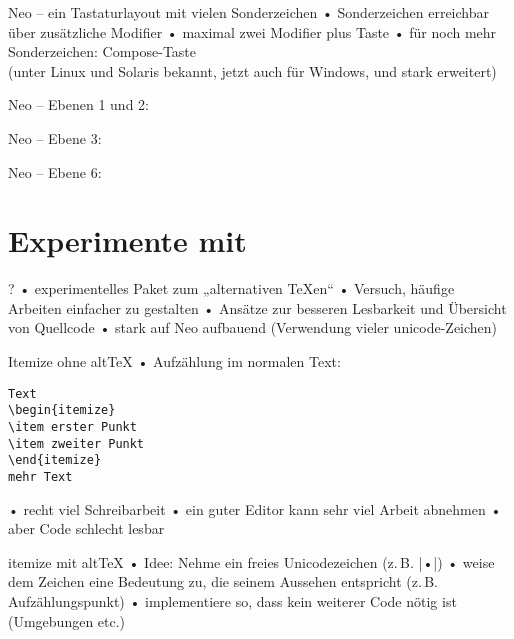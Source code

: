 \documentclass[t]{beamer}
\begin{document}
\begin{frame}[fragile]{Neo – ein Tastaturlayout mit vielen Sonderzeichen}
• Sonderzeichen erreichbar über zusätzliche Modifier
• maximal zwei Modifier plus Taste
• für noch mehr Sonderzeichen: Compose-Taste\\%
(unter Linux und Solaris bekannt, jetzt auch für Windows, und stark erweitert)
\•
\end{frame}

\begin{frame}{Neo – Ebenen 1 und 2:}

\end{frame}

\begin{frame}{Neo – Ebene 3:}

\end{frame} 

\begin{frame}{Neo – Ebene 6:}

\end{frame} 

\section{Experimente mit \altTeX}
\begin{frame}{\altTeX?}
• experimentelles Paket zum „alternativen \TeX en“
• Versuch, häufige Arbeiten einfacher zu gestalten
• Ansätze zur besseren Lesbarkeit und Übersicht von Quellcode
• stark auf Neo aufbauend (Verwendung vieler unicode-Zeichen)
\•
\end{frame}

\begin{frame}[fragile]{Itemize ohne alt\TeX}
• Aufzählung im normalen Text:
\begin{verbatim}
Text
\begin{itemize}
\item erster Punkt
\item zweiter Punkt
\end{itemize}
mehr Text
\end{verbatim}
• recht viel Schreibarbeit
• ein guter Editor kann sehr viel Arbeit abnehmen
• aber Code schlecht lesbar
\•
\end{frame}

\begin{frame}[fragile]{itemize mit alt\TeX}
• Idee: Nehme ein freies Unicodezeichen (z.\,B. |•|)
• weise dem Zeichen eine Bedeutung zu, die seinem Aussehen entspricht (z.\,B. Aufzählungspunkt)
• implementiere so, dass kein weiterer Code nötig ist (Umgebungen etc.)
\•
\end{frame}
\end{document}
